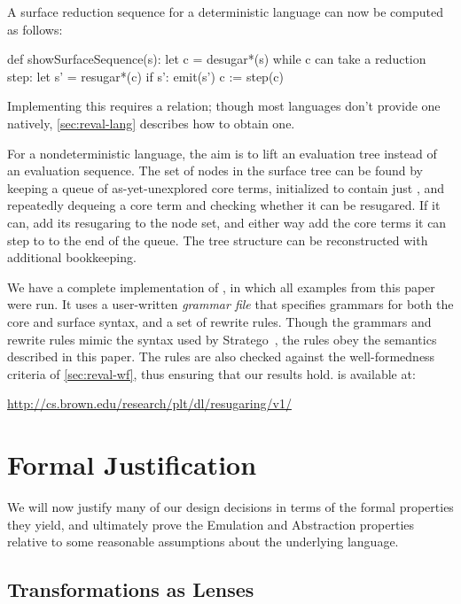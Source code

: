 A surface reduction sequence for a deterministic language can now be
computed as follows:
\begin{Codes}
def showSurfaceSequence(s):
  let c = desugar*(s)
  while c can take a reduction step:
    let s' = resugar*(c)
    if s': emit(s')
    c := step(c)
\end{Codes}
Implementing
this requires a  relation; though most languages
don't provide one natively, {\cref{sec:reval-lang}} describes how to
obtain one.

For a nondeterministic language, the aim is to lift an evaluation tree
instead of an evaluation sequence. The set of nodes in the surface tree
can be found by keeping a queue of as-yet-unexplored core terms,
initialized to contain just , and repeatedly dequeing a
core term and checking whether it can be resugared. If it can, add its
resugaring to the node set, and either way add the core terms it can step to to the end of
the queue. The tree structure can be reconstructed with additional
bookkeeping.

We have a complete implementation of {\Resugarer}, in
which all examples from this paper were run. It uses a user-written
\emph{grammar file} that specifies grammars for both the core and surface
syntax, and a set of rewrite rules. Though the grammars and rewrite rules
mimic the syntax used by Stratego~\cite{stratego}, the rules obey the semantics described in this
paper. The rules are also checked against the well-formedness criteria of
\cref{sec:reval-wf}, thus ensuring that our results hold. {\Resugarer} is available at:
\begin{center}
\url{http://cs.brown.edu/research/plt/dl/resugaring/v1/}
\end{center}


\section{Formal Justification}
\label{sec:reval-formal}

We will now justify many of our design decisions in terms of the formal
properties they yield, and ultimately prove the Emulation and Abstraction
properties relative to some reasonable assumptions about the underlying
language.

\subsection{Transformations as Lenses}
\label{sec:reval-lenses}

